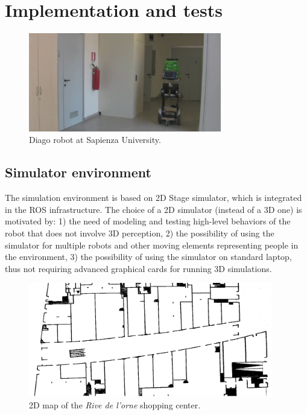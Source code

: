 \section{Implementation and tests}



\begin{figure}
\centering
\includegraphics[width=0.75\textwidth]{fig/diago.png}
\caption{Diago robot at Sapienza University.}
\label{fig:diago}
\end{figure}



\subsection{Simulator environment}

The simulation environment is based on 2D Stage simulator, which is integrated in the ROS infrastructure. The choice of a 2D simulator (instead of a 3D one) is motivated by: 1) the need of modeling and testing high-level behaviors of the robot that does not involve 3D perception, 2) the possibility of using the simulator for multiple robots and other moving elements representing people in the environment, 3) the possibility of using the simulator on standard laptop, thus not requiring advanced graphical cards for running 3D simulations.

\begin{figure}
\centering
\includegraphics[width=0.95\textwidth]{fig/Rive1.png}
\caption{2D map of the \emph{Rive de l'orne} shopping center.}
\label{fig:stage}
\end{figure}


